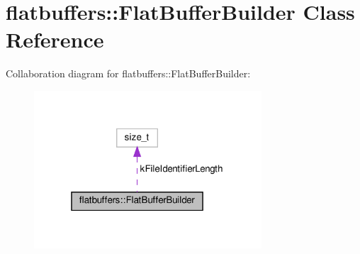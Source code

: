 \hypertarget{classflatbuffers_1_1FlatBufferBuilder}{}\section{flatbuffers\+:\+:Flat\+Buffer\+Builder Class Reference}
\label{classflatbuffers_1_1FlatBufferBuilder}


Collaboration diagram for flatbuffers\+:\+:Flat\+Buffer\+Builder\+:
\nopagebreak
\begin{figure}[H]
\begin{center}
\leavevmode
\includegraphics[width=241pt]{classflatbuffers_1_1FlatBufferBuilder__coll__graph}
\end{center}
\end{figure}
